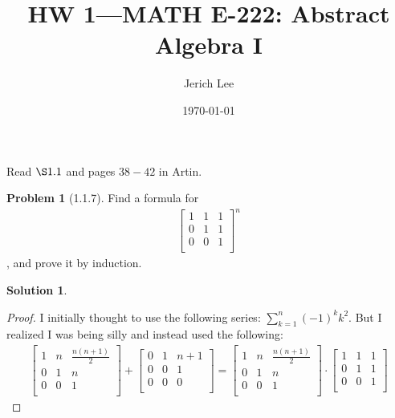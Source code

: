 \documentclass[12pt]{article}
\title{HW 1—MATH E-222: Abstract Algebra I}
\author{Jerich Lee}
\date{\today}
\theoremstyle{definition} %
\newtheorem{solution}{Solution}
\newtheorem{problem}{Problem}
\theoremstyle{plain} %
\begin{document}
\maketitle
\noindent
Read $\S 1.1$ and pages $38-42$ in Artin.  
\begin{problem}[1.1.7]
    Find a formula for 
    \begin{align}
        \begin{bmatrix}
        1 & 1 &  1 \\
        0 & 1 &  1 \\
        0 & 0 &  1 \\
    \end{bmatrix}^{n}
    \end{align}, and prove it by induction. 
\end{problem}
\begin{solution}

    \begin{proof}
         I initially thought to use the following series:
    $\sum_{k=1}^{n} (-1)^{k}k^{2}$. But I realized I was being silly and instead used the following:
    \begin{align}
     \begin{bmatrix}
        1 & n &  \frac{n(n+1)}{2} \\
         0 & 1 & n  \\
         0& 0 & 1  \\
    \end{bmatrix}+\begin{bmatrix}
        0 & 1 &n+1   \\
         0&0  &1  \\
         0&0  &0   \\
    \end{bmatrix}=\begin{bmatrix}
        1 & n &  \frac{n(n+1)}{2} \\
         0 & 1 & n  \\
         0& 0 & 1  \\
    \end{bmatrix}\cdot \begin{bmatrix}
        1 & 1 &  1 \\
        0 & 1 &  1 \\
        0 & 0 &  1 \\
    \end{bmatrix} 
    \end{align}
    \end{proof}
    \end{solution}
\end{document}
